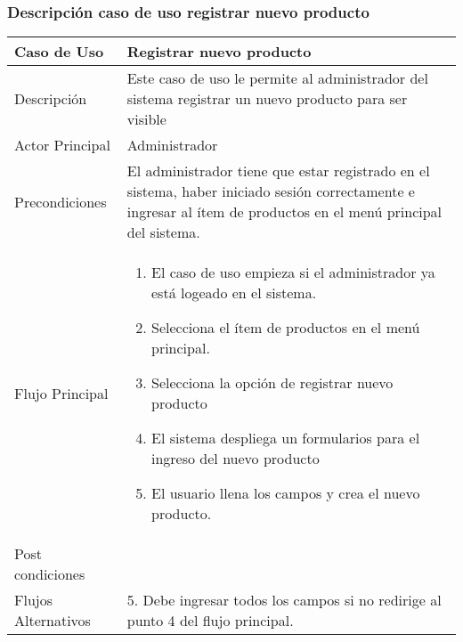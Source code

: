 \documentclass[12pt,a4paper]{article}
\begin{document}
\subsubsection*{Descripción caso de uso registrar nuevo producto}
\begin{table}[h]
        \centering
        \begin{tabular}{| p{3cm}| p{11cm} |} 
        \hline  
        Caso de Uso         &    \textbf{Registrar nuevo producto }   \\ 
        \hline
        Descripción         & Este caso de uso le permite al administrador del sistema registrar un nuevo producto para ser visible      \\ 
        \hline
        Actor Principal     & Administrador     \\ 
        \hline
        Precondiciones      & El administrador tiene que estar registrado en el sistema, haber iniciado sesión correctamente e ingresar al ítem de productos en el menú principal del sistema.    	\\
        \hline
        Flujo Principal     &    

            \begin{enumerate}
                \item El caso de uso empieza si el administrador ya está logeado en el sistema.
                \item Selecciona el ítem de productos en el menú principal.
                \item Selecciona la opción de registrar nuevo producto
                \item El sistema despliega un formularios para el ingreso del nuevo producto
                \item El usuario llena los campos y crea el nuevo producto.
            \end{enumerate}
        \\  
        \hline
        Post condiciones    &       \\  
        \hline
        Flujos Alternativos &  5. Debe ingresar todos los campos si no redirige al punto 4 del flujo principal.     \\  
        \hline
        \end{tabular}
    \end{table}

    \newpage
\end{document}
